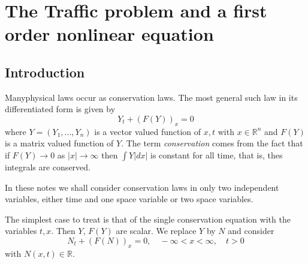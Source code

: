
\chapter{The Traffic problem and a first order nonlinear equation}\label{chap1}

\section{Introduction}\label{chap1:sec1.1}

Many\pageoriginale physical laws occur as conservation laws. The most
general such law in its differentiated form is given by  
$$
Y_t + (F(Y))_x = 0 
$$
where $Y = (Y_1, \ldots , Y_n)$ is a vector valued function of $x,t$
with $x \in \mathbb{R}^n$ and $F(Y)$ is a matrix valued function of
$Y$. The term {\em conservation} comes from the fact that if $F(Y) \to
0$ as $|x| \to \infty $ then $\int Y |dx|$ is constant for all time,
that is, thes integrals are conserved. 

In these notes we shall consider conservation laws in only two
independent variables, either time and one space variable or two space
variables. 

The simplest case to treat is that of the single conservation equation
with the variables $t, x$. Then $Y$, $F(Y)$ are scalar. We replace $Y$
by $N$ and consider 
\begin{equation*}
N_t + (F(N))_x = 0, \quad -\infty < x < \infty, \quad t > 0
\tag{1.1}\label{eq1.1}
\end{equation*}
with $N(x,t) \in \mathbb{R}$. 

